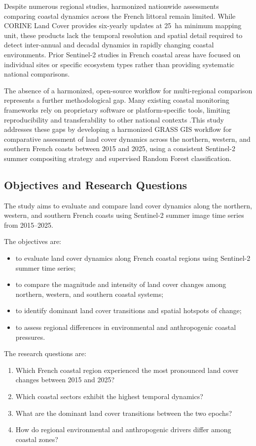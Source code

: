 \documentclass[coasts,article,submit,pdftex,moreauthors]{Definitions/mdpi}
\begin{document}
Despite numerous regional studies, harmonized nationwide assessments comparing coastal dynamics across the French littoral remain limited. While CORINE Land Cover provides six-yearly updates at 25~ha minimum mapping unit, these products lack the temporal resolution and spatial detail required to detect inter-annual and decadal dynamics in rapidly changing coastal environments. Prior Sentinel-2 studies in French coastal areas have focused on individual sites or specific ecosystem types rather than providing systematic national comparisons.

The absence of a harmonized, open-source workflow for multi-regional comparison represents a further methodological gap. Many existing coastal monitoring frameworks rely on proprietary software or platform-specific tools, limiting reproducibility and transferability to other national contexts \citep{camara2020open,ferreira2021reproducible,Lemenkova2023GRASS}.This study addresses these gaps by developing a harmonized GRASS GIS workflow for comparative assessment of land cover dynamics across the northern, western, and southern French coasts between 2015 and 2025, using a consistent Sentinel-2 summer compositing strategy and supervised Random Forest classification.

\subsection{Objectives and Research Questions}

The study aims to evaluate and compare land cover dynamics along the northern, western, and southern French coasts using Sentinel-2 summer image time series from 2015–2025. 

The objectives are:
\begin{itemize}
\item to evaluate land cover dynamics along French coastal regions using Sentinel-2 summer time series;
\item to compare the magnitude and intensity of land cover changes among northern, western, and southern coastal systems;
\item to identify dominant land cover transitions and spatial hotspots of change;
\item to assess regional differences in environmental and anthropogenic coastal pressures.
\end{itemize}

The research questions are:
\begin{enumerate}
\item Which French coastal region experienced the most pronounced land cover changes between 2015 and 2025?
\item Which coastal sectors exhibit the highest temporal dynamics?
\item What are the dominant land cover transitions between the two epochs?
\item How do regional environmental and anthropogenic drivers differ among coastal zones?
\end{enumerate}
\end{document}
